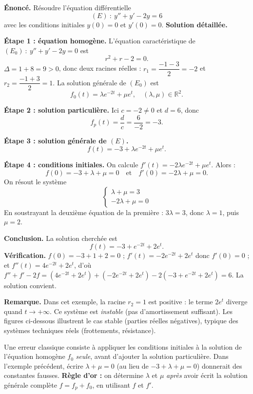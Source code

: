 \documentclass[11pt]{article}
\begin{document}
\begin{exoresolu}
\textbf{Énoncé.} Résoudre l'équation différentielle
\[ (E)\ :\ y''+y'-2y=6 \]
avec les conditions initiales $y(0)=0$ et $y'(0)=0$.
\tcblower
\textbf{Solution détaillée.}

\textbf{Étape 1 : équation homogène.} L'équation caractéristique de $(E_0)\ :\ y''+y'-2y=0$ est
\[ r^2+r-2=0. \]
$\Delta=1+8=9>0$, donc deux racines réelles : $r_1=\dfrac{-1-3}{2}=-2$ et $r_2=\dfrac{-1+3}{2}=1$. La solution générale de $(E_0)$ est
\[ f_0(t)=\lambda e^{-2t}+\mu e^{t},\quad (\lambda,\mu)\in\mathbb{R}^2. \]

\textbf{Étape 2 : solution particulière.} Ici $c=-2\neq 0$ et $d=6$, donc
\[ f_p(t)=\dfrac{d}{c}=\dfrac{6}{-2}=-3. \]

\textbf{Étape 3 : solution générale de $(E)$.}
\[ f(t)=-3+\lambda e^{-2t}+\mu e^{t}. \]

\textbf{Étape 4 : conditions initiales.} On calcule $f'(t)=-2\lambda e^{-2t}+\mu e^{t}$. Alors :
\[ f(0)=-3+\lambda+\mu=0 \quad\text{et}\quad f'(0)=-2\lambda+\mu=0. \]
On résout le système
\[ \begin{cases} \lambda+\mu=3\\ -2\lambda+\mu=0 \end{cases} \]
En soustrayant la deuxième équation de la première : $3\lambda=3$, donc $\lambda=1$, puis $\mu=2$.

\textbf{Conclusion.} La solution cherchée est
\[ f(t)=-3+e^{-2t}+2e^{t}. \]
\textbf{Vérification.} $f(0)=-3+1+2=0$ ; $f'(t)=-2e^{-2t}+2e^t$ donc $f'(0)=0$ ; et $f''(t)=4e^{-2t}+2e^t$, d'où $f''+f'-2f=(4e^{-2t}+2e^t)+(-2e^{-2t}+2e^t)-2(-3+e^{-2t}+2e^t)=6$. La solution convient.

\textbf{Remarque.} Dans cet exemple, la racine $r_2=1$ est positive : le terme $2e^{t}$ diverge quand $t\to+\infty$. Ce système est \emph{instable} (pas d'amortissement suffisant). Les figures ci-dessous illustrent le cas stable (parties réelles négatives), typique des systèmes techniques réels (frottements, résistance).
\end{exoresolu}

\begin{attention}
Une erreur classique consiste à appliquer les conditions initiales à la solution de l'équation homogène $f_0$ \emph{seule}, avant d'ajouter la solution particulière. Dans l'exemple précédent, écrire $\lambda+\mu=0$ (au lieu de $-3+\lambda+\mu=0$) donnerait des constantes fausses. \textbf{Règle d'or :} on détermine $\lambda$ et $\mu$ \emph{après} avoir écrit la solution générale complète $f=f_p+f_0$, en utilisant $f$ et $f'$.
\end{attention}
\end{document}
